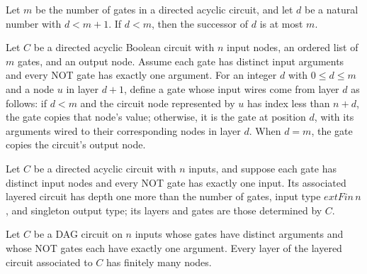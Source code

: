 \begin{theorem}
\label{BoolCircuit.DAGCircuit.succ_le}
\leanok
{}
Let $m$ be the number of gates in a directed acyclic circuit, and let $d$ be a natural
number with $d<m+1$. If $d<m$, then the successor of $d$ is at most $m$.
\end{theorem}

\begin{definition}
\label{BoolCircuit.DAGCircuit.layerGate}
\leanok
{}
Let $C$ be a directed acyclic Boolean circuit with $n$ input nodes, an ordered list of
$m$ gates, and an output node. Assume each gate has distinct input arguments and every
NOT gate has exactly one argument. For an integer $d$ with $0 \le d \le m$ and a node
$u$ in layer $d+1$, define a gate whose input wires come from layer $d$ as follows: if
$d<m$ and the circuit node represented by $u$ has index less than $n+d$, the gate copies
that node's value; otherwise, it is the gate at position $d$, with its arguments wired
to their corresponding nodes in layer $d$. When $d=m$, the gate copies the circuit's
output node.
\end{definition}

\begin{definition}
\label{BoolCircuit.DAGCircuit.toLayered}
\leanok
{}
Let $C$ be a directed acyclic circuit with $n$ inputs, and suppose each gate has
distinct input nodes and every NOT gate has exactly one input. Its associated layered
circuit has depth one more than the number of gates, input type $	ext{Fin}\,n$, and
singleton output type; its layers and gates are those determined by $C$.
\end{definition}

\begin{theorem}
\label{BoolCircuit.DAGCircuit.toLayered_finite}
\leanok
{}
Let $C$ be a DAG circuit on $n$ inputs whose gates have distinct arguments and whose NOT
gates each have exactly one argument. Every layer of the layered circuit associated to
$C$ has finitely many nodes.
\end{theorem}

